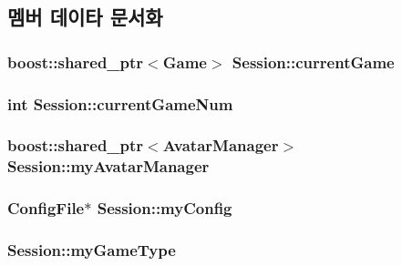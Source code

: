 \subsection{멤버 데이타 문서화}
\hypertarget{class_session_a5c15d5f1be74a30fa167a0af5822113c}{
\subsubsection[{current\-Game}]{\setlength{\rightskip}{0pt plus 5cm}boost\-::shared\-\_\-ptr$<$Game$>$ Session\-::current\-Game\hspace{0.3cm}{\ttfamily [private]}}}\label{class_session_a5c15d5f1be74a30fa167a0af5822113c}
\hypertarget{class_session_a89974964b38a285de9ec954b99b0ee3f}{
\subsubsection[{current\-Game\-Num}]{\setlength{\rightskip}{0pt plus 5cm}int Session\-::current\-Game\-Num\hspace{0.3cm}{\ttfamily [private]}}}\label{class_session_a89974964b38a285de9ec954b99b0ee3f}
\hypertarget{class_session_a53231528d2b4c4babd97c7d1194a5f7e}{
\subsubsection[{my\-Avatar\-Manager}]{\setlength{\rightskip}{0pt plus 5cm}boost\-::shared\-\_\-ptr$<$Avatar\-Manager$>$ Session\-::my\-Avatar\-Manager\hspace{0.3cm}{\ttfamily [private]}}}\label{class_session_a53231528d2b4c4babd97c7d1194a5f7e}
\hypertarget{class_session_a5bfbe43c623b688e7def57e02704033f}{
\subsubsection[{my\-Config}]{\setlength{\rightskip}{0pt plus 5cm}Config\-File$\ast$ Session\-::my\-Config\hspace{0.3cm}{\ttfamily [private]}}}\label{class_session_a5bfbe43c623b688e7def57e02704033f}
\hypertarget{class_session_acf11b7b3982bc3e4c5bbf635d5e98496}{
\subsubsection[{my\-Game\-Type}]{ Session\-::my\-Game\-Type\hspace{0.3cm}{\ttfamily [private]}}}\label{class_session_acf11b7b3982bc3e4c5bbf635d5e98496}
